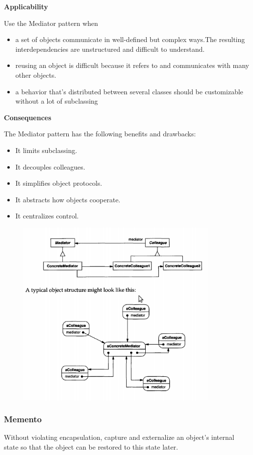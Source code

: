 \documentclass{article}
\begin{document}
\textbf{Applicability}

Use the Mediator pattern when

\begin{itemize}
    \item a set of objects communicate in well-defined but complex ways.The resulting interdependencies are unstructured and difficult to understand. 
    \item reusing an object is difficult because it refers to and communicates with many other objects.
    \item a behavior that's distributed between several classes should be customizable without a lot of subclassing
\end{itemize}

\textbf{Consequences}

The Mediator pattern has the following benefits and drawbacks:
\begin{itemize}
    \item It limits subclassing.
    \item It decouples colleagues.
    \item It simplifies object protocols.
    \item It abstracts how objects cooperate.
    \item It centralizes control.
\end{itemize}

\begin{figure}[h]
    \centering
    \includegraphics[width=10cm]{diagrams/pattern-17-mediator.png}
\end{figure}

\newpage
\subsubsection{Memento}
Without violating encapsulation, capture and externalize an object's internal state so that the object can be restored to this state later.
\end{document}
